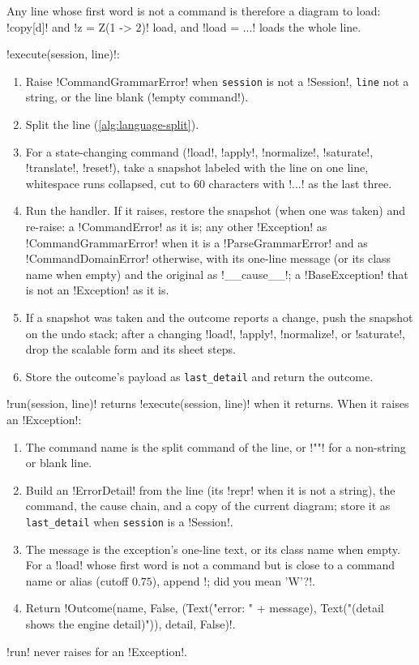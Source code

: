 Any line whose first word is not a command is therefore a diagram to load: \code!copy[d]! and \code!z = Z(1 -> 2)! load, and \code!load = ...! loads the whole line.

\begin{algorithm}\label{alg:language-execute}
\leavevmode
\py!execute(session, line)!:
\begin{enumerate}
\item Raise \py!CommandGrammarError! when \texttt{session} is not a \py!Session!, \texttt{line} not a string, or the line blank (\code!empty command!).
\item Split the line (\cref{alg:language-split}).
\item For a state-changing command (\azx!load!, \azx!apply!, \azx!normalize!, \azx!saturate!, \azx!translate!, \azx!reset!), take a snapshot labeled with the line on one line, whitespace runs collapsed, cut to 60 characters with \code!...! as the last three.
\item Run the handler. If it raises, restore the snapshot (when one was taken) and re-raise: a \py!CommandError! as it is; any other \py!Exception! as \py!CommandGrammarError! when it is a \py!ParseGrammarError! and as \py!CommandDomainError! otherwise, with its one-line message (or its class name when empty) and the original as \py!__cause__!; a \py!BaseException! that is not an \py!Exception! as it is.
\item If a snapshot was taken and the outcome reports a change, push the snapshot on the undo stack; after a changing \azx!load!, \azx!apply!, \azx!normalize!, or \azx!saturate!, drop the scalable form and its sheet steps.
\item Store the outcome's payload as \texttt{last\_detail} and return the outcome.
\end{enumerate}
\end{algorithm}

\begin{algorithm}\label{alg:language-run}
\leavevmode
\py!run(session, line)! returns \py!execute(session, line)! when it returns. When it raises an \py!Exception!:
\begin{enumerate}
\item The command name is the split command of the line, or \code!""! for a non-string or blank line.
\item Build an \py!ErrorDetail! from the line (its \py!repr! when it is not a string), the command, the cause chain, and a copy of the current diagram; store it as \texttt{last\_detail} when \texttt{session} is a \py!Session!.
\item The message is the exception's one-line text, or its class name when empty. For a \azx!load! whose first word is not a command but is close to a command name or alias (cutoff $0.75$), append \code!; did you mean 'W'?!.
\item Return \code!Outcome(name, False, (Text("error: " + message), Text("(detail shows the engine detail)")), detail, False)!.
\end{enumerate}
\py!run! never raises for an \py!Exception!.
\end{algorithm}

